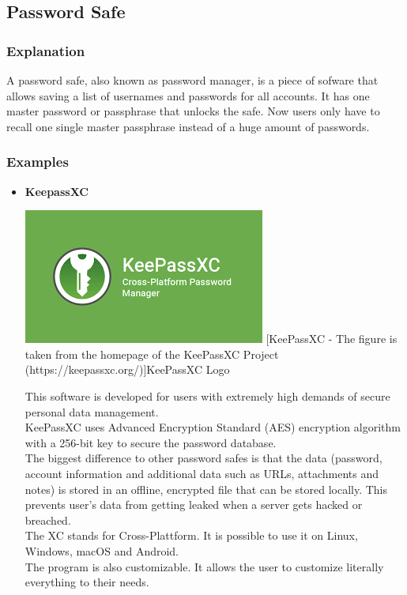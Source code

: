 \documentclass[conference]{IEEEtran}
\begin{document}
\subsection{Password Safe}
\subsubsection{Explanation}
A password safe, also known as password manager, is a piece of sofware that allows saving a list of usernames and passwords for all accounts. It has one master password or passphrase that unlocks the safe. Now users only have to recall one single master passphrase instead of a huge amount of passwords.
\subsubsection{Examples}
\begin{itemize}
    \item \textbf{KeepassXC}\\
          \begin{center}
              \includegraphics[scale=0.6]{./images/KeePass.png}
              [KeePassXC - The figure is taken from the homepage of the KeePassXC Project (https://keepassxc.org/)]{KeePassXC Logo}
          \end{center}

          This software is developed for users with extremely high demands of secure personal data management. \\
          KeePassXC uses Advanced Encryption Standard (AES) encryption algorithm with a 256-bit key to secure the password database.\\
          The biggest difference to other password safes is that the data (password, account information and additional data such as URLs, attachments and notes) is stored in an offline, encrypted file that can be stored locally. This prevents user's data from getting leaked when a server gets hacked or breached.\\
          The XC stands for Cross-Plattform. It is possible to use it on Linux, Windows, macOS and Android.\\
          The program is also customizable. It allows the user to customize literally everything to their needs.\cite{b6}\\



\end{itemize}
\end{document}
